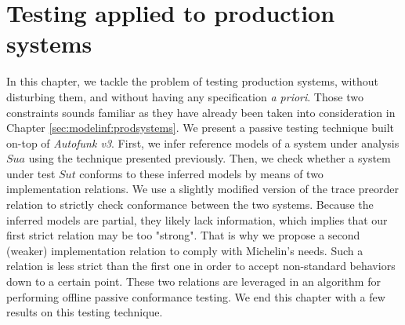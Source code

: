 %
\chapter{Testing applied to production systems}
\label{sec:testing}

In this chapter, we tackle the problem of testing production
systems, without disturbing them, and without having any
specification \emph{a priori}. Those two constraints sounds
familiar as they have already been taken into consideration in
Chapter \ref{sec:modelinf:prodsystems}. We present a passive
testing technique built on-top of \emph{Autofunk v3}. First, we
infer reference models of a system under analysis $\mathit{Sua}$
using the technique presented previously.  Then, we check whether
a system under test $\mathit{Sut}$ conforms to these inferred
models by means of two implementation relations. We use a
slightly modified version of the trace preorder relation to
strictly check conformance between the two systems. Because the
inferred models are partial, they likely lack information, which
implies that our first strict relation may be too "strong".  That
is why we propose a second (weaker) implementation relation to
comply with Michelin's needs.  Such a relation is less strict
than the first one in order to accept non-standard behaviors down
to a certain point. These two relations are leveraged in an
algorithm for performing offline passive conformance testing.  We
end this chapter with a few results on this testing technique.\\

\minitoc

\pagebreak






\cleardoublepage
\blankpage
